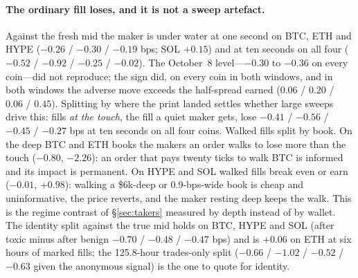 \documentclass[11pt]{article}
\begin{document}
\paragraph{The ordinary fill loses, and it is not a sweep artefact.} Against the fresh mid the maker is under water at one second on BTC, ETH and HYPE ($-0.26$ / $-0.30$ / $-0.19$ bps; SOL $+0.15$) and at ten seconds on all four ($-0.52$ / $-0.92$ / $-0.25$ / $-0.02$). The October~8 level---$-0.30$ to $-0.36$ on every coin---did not reproduce; the sign did, on every coin in both windows, and in both windows the adverse move exceeds the half-spread earned ($0.06$ / $0.20$ / $0.06$ / $0.45$). Splitting by where the print landed settles whether large sweeps drive this: fills \emph{at the touch}, the fill a quiet maker gets, lose $-0.41$ / $-0.56$ / $-0.45$ / $-0.27$ bps at ten seconds on all four coins. Walked fills split by book. On the deep BTC and ETH books the makers an order walks to lose more than the touch ($-0.80$, $-2.26$): an order that pays twenty ticks to walk BTC is informed and its impact is permanent. On HYPE and SOL walked fills break even or earn ($-0.01$, $+0.98$): walking a \$6k-deep or $0.9$-bps-wide book is cheap and uninformative, the price reverts, and the maker resting deep keeps the walk. This is the regime contrast of \S\ref{sec:takers} measured by depth instead of by wallet. The identity split against the true mid holds on BTC, HYPE and SOL (after toxic minus after benign $-0.70$ / $-0.48$ / $-0.47$ bps) and is $+0.06$ on ETH at six hours of marked fills; the 125.8-hour trades-only split ($-0.66$ / $-1.02$ / $-0.52$ / $-0.63$ given the anonymous signal) is the one to quote for identity.
\end{document}
